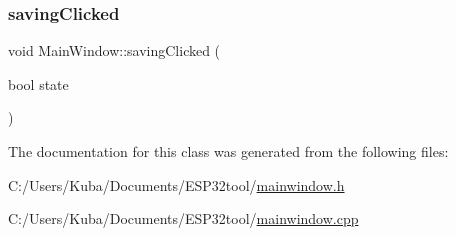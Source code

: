 \mbox{\label{class_main_window_a02844dac36eef12a555efacba15722e3}} 
\subsubsection{\texorpdfstring{saving\+Clicked}{savingClicked}}
{\footnotesize\ttfamily void Main\+Window\+::saving\+Clicked (\begin{DoxyParamCaption}\item[{bool}]{state }\end{DoxyParamCaption})\hspace{0.3cm}{\ttfamily [slot]}}



The documentation for this class was generated from the following files\+:\begin{DoxyCompactItemize}
\item 
C\+:/\+Users/\+Kuba/\+Documents/\+E\+S\+P32tool/\hyperlink{mainwindow_8h}{mainwindow.\+h}\item 
C\+:/\+Users/\+Kuba/\+Documents/\+E\+S\+P32tool/\hyperlink{mainwindow_8cpp}{mainwindow.\+cpp}\end{DoxyCompactItemize}
